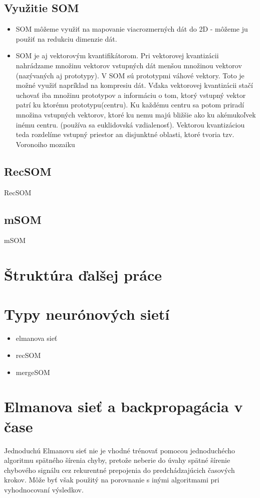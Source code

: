 \subsection{Využitie SOM}
\begin{itemize}
\item SOM môžeme využiť na mapovanie viacrozmerných dát do 2D - môžeme ju použiť na redukciu dimenzie dát.
\item SOM je aj vektorovým kvantifikátorom. Pri vektorovej kvantizácii nahrádzame množinu vektorov vstupných dát menšou množinou vektorov (nazývaných aj prototypy). V SOM sú prototypmi
		váhové vektory. Toto je možné využiť napríklad na kompresiu dát. Vďaka vektorovej kvantizácii stačí uchovať iba množinu prototypov a informáciu o tom, ktorý vstupný vektor patrí 
		ku ktorému prototypu(centru). Ku každému centru sa potom priradí množina vstupných vektorov, ktoré ku nemu majú bližšie ako ku akémukoľvek inému centru. (používa sa euklidovská vzdialenosť).
		Vektorou kvantizáciou teda rozdelíme vstupný priestor an disjunktné oblasti, ktoré tvoria tzv. Voronoiho mozaiku
\end{itemize}


\subsection{RecSOM}
RecSOM


\subsection{mSOM}
mSOM



\section{Štruktúra ďalšej práce}
\section{Typy neurónových sietí}
\begin{itemize}
	\item elmanova sieť
	\item recSOM
	\item mergeSOM
\end{itemize}
\section{Elmanova sieť a backpropagácia v čase}
Jednoduchú Elmanovu sieť nie je vhodné trénovať pomocou jednoduchécho algoritmu spätného šírenia chyby, pretože neberie do úvahy spätné šírenie chybového signálu cez rekurentné prepojenia do predchádzajúcich časových krokov.
Môže byť však použitý na porovnanie s inými algoritmami pri vyhodnocovaní výsledkov.

